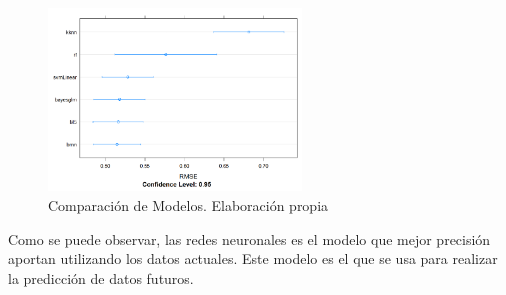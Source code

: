 \begin{subappendices}
\begin{figure}[htb]
	\centering
	\caption{Comparación de Modelos. Elaboración propia}
	\includegraphics[width=0.6\textwidth]{recursos/ImagenesR/ComparacionModelos}

\end{figure}
\FloatBarrier

Como se puede observar, las redes neuronales es el modelo que mejor precisión aportan utilizando los datos actuales. Este modelo es el que se usa para realizar la predicción de datos futuros.
\end{subappendices}



